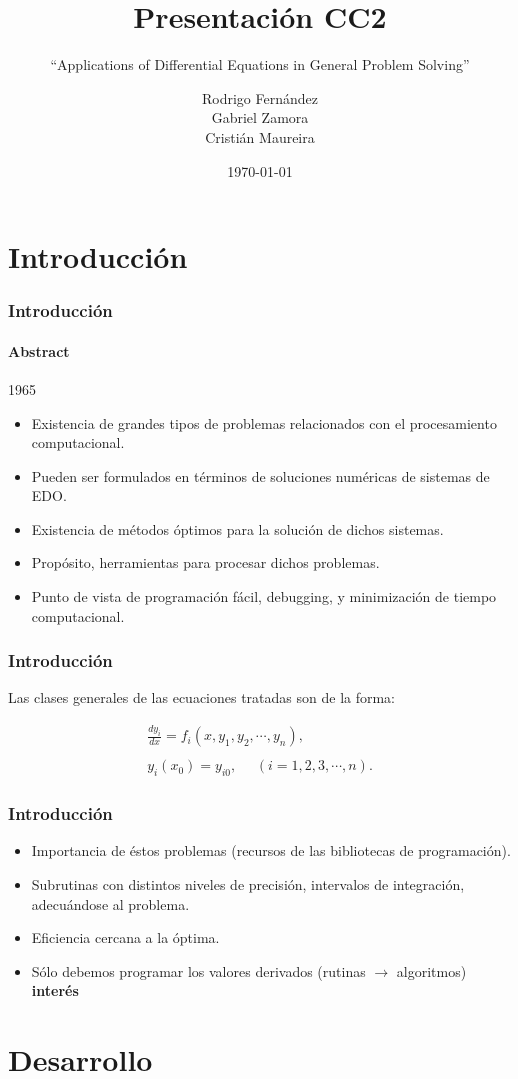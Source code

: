 \documentclass{beamer}
\title{Presentación CC2}
\subtitle{``Applications of Differential Equations in General Problem Solving''}
\author[R. Fernández/G. Zamora/C. Maureira/]{Rodrigo Fernández\\Gabriel Zamora\\Cristián Maureira}
\date{\today}
\begin{document}
\frame
{
	\titlepage
}

\frame
{
	\tableofcontents
}

\section{Introducción}
\frame
{
\frametitle{Introducción}
\framesubtitle{Abstract}
\begin{center}
	1965
\end{center}
\begin{itemize}
	\item Existencia de grandes tipos de problemas relacionados con el procesamiento computacional.
	\item Pueden ser formulados en términos de soluciones numéricas de sistemas de EDO.
	\item Existencia de métodos óptimos para la solución de dichos sistemas.
	\item Propósito, herramientas para procesar dichos problemas.
	\item Punto de vista de programación fácil, debugging, y minimización de tiempo computacional.
\end{itemize}
}

\frame
{
\frametitle{Introducción}
Las clases generales de las ecuaciones tratadas son de la forma:

\begin{eqnarray}
\frac{dy_i}{dx} = f_i (x, y_1, y_2 , \cdots, y_n), \nonumber \\
                \\
y_i (x_0) = y_{i0} ,\ \ \ \ \ \ (i  = 1, 2, 3, \cdots, n). \nonumber
\end{eqnarray}

}

\frame
{
\frametitle{Introducción}
\begin{itemize}
	\item Importancia de éstos problemas (recursos de las bibliotecas de programación).
	\item Subrutinas con distintos niveles de precisión, intervalos de integración, adecuándose al problema.
	\item Eficiencia cercana a la óptima.
	\item Sólo debemos programar los valores derivados (rutinas $\rightarrow$ algoritmos) \textbf{interés}
\end{itemize}
}

\section{Desarrollo}
\end{document}
